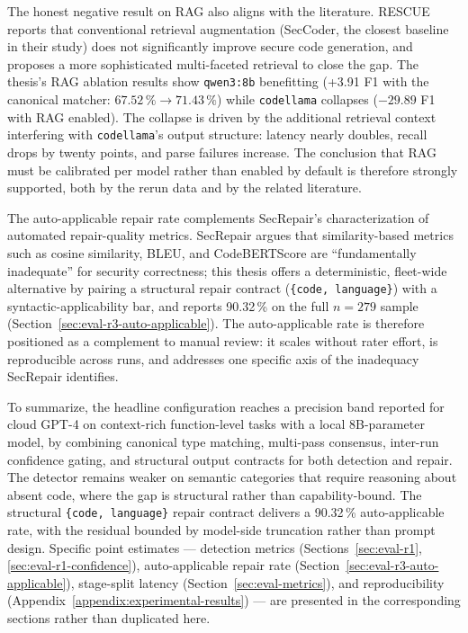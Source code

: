 The honest negative result on RAG also aligns with the literature. RESCUE~\cite{shi2025rescue} reports that conventional retrieval augmentation (SecCoder, the closest baseline in their study) does not significantly improve secure code generation, and proposes a more sophisticated multi-faceted retrieval to close the gap. The thesis's RAG ablation results show \texttt{qwen3:8b} benefitting (+3.91 F1 with the canonical matcher: $67.52\,\% \to 71.43\,\%$) while \texttt{codellama} collapses ($-29.89$ F1 with RAG enabled). The collapse is driven by the additional retrieval context interfering with \texttt{codellama}'s output structure: latency nearly doubles, recall drops by twenty points, and parse failures increase. The conclusion that RAG must be calibrated per model rather than enabled by default is therefore strongly supported, both by the rerun data and by the related literature.

The auto-applicable repair rate complements SecRepair's characterization of automated repair-quality metrics. SecRepair argues that similarity-based metrics such as cosine similarity, BLEU, and CodeBERTScore are ``fundamentally inadequate'' for security correctness; this thesis offers a deterministic, fleet-wide alternative by pairing a structural repair contract (\texttt{\{code, language\}}) with a syntactic-applicability bar, and reports 90.32\,\% on the full $n=279$ sample (Section~\ref{sec:eval-r3-auto-applicable}). The auto-applicable rate is therefore positioned as a complement to manual review: it scales without rater effort, is reproducible across runs, and addresses one specific axis of the inadequacy SecRepair identifies.

\medskip

To summarize, the headline configuration reaches a precision band reported for cloud GPT-4 on context-rich function-level tasks with a local 8B-parameter model, by combining canonical type matching, multi-pass consensus, inter-run confidence gating, and structural output contracts for both detection and repair. The detector remains weaker on semantic categories that require reasoning about absent code, where the gap is structural rather than capability-bound. The structural \texttt{\{code, language\}} repair contract delivers a 90.32\,\% auto-applicable rate, with the residual bounded by model-side truncation rather than prompt design. Specific point estimates --- detection metrics (Sections~\ref{sec:eval-r1}, \ref{sec:eval-r1-confidence}), auto-applicable repair rate (Section~\ref{sec:eval-r3-auto-applicable}), stage-split latency (Section~\ref{sec:eval-metrics}), and reproducibility (Appendix~\ref{appendix:experimental-results}) --- are presented in the corresponding sections rather than duplicated here.
